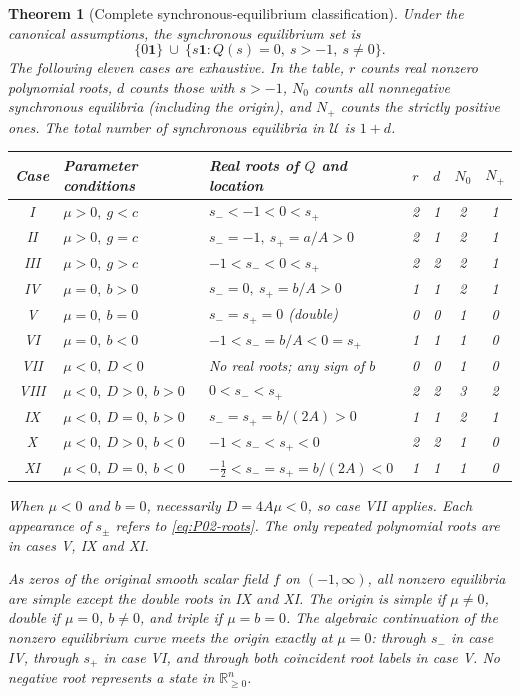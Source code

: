 \documentclass[11pt]{article}
\newcommand{\R}{\mathbb{R}}
\newcommand{\one}{\mathbf{1}}
\newcommand{\Orth}{\R_{\geq 0}^{n}}
\newcommand{\Domain}{\mathcal{U}}
\newtheorem{theorem}{Theorem}[section]
\theoremstyle{definition}
\theoremstyle{remark}
\begin{document}
\begin{theorem}[Complete synchronous-equilibrium classification]
\label{thm:P02-complete}
Under the canonical assumptions, the synchronous equilibrium set is
\begin{equation}
\label{eq:P02-equilibrium-set}
 \{0\one\}\ \cup\
 \{s\one:Q(s)=0,\ s>-1,\ s\ne0\}.
\end{equation}
The following eleven cases are exhaustive. In the table, $r$ counts
real nonzero polynomial roots, $d$ counts those with $s>-1$, $N_0$
counts all nonnegative synchronous equilibria (including the origin),
and $N_+$ counts the strictly positive ones. The total number of
synchronous equilibria in $\Domain$ is $1+d$.

\begin{center}
\small
\renewcommand{\arraystretch}{1.18}
\begin{tabular}{@{}c p{} p{} c c c c@{}}
\toprule
Case & Parameter conditions & Real roots of $Q$ and location
 & $r$ & $d$ & $N_0$ & $N_+$\\
\midrule
I & $\mu>0,\ g<c$ & $s_-<-1<0<s_+$ & 2&1&2&1\\
II & $\mu>0,\ g=c$ & $s_-=-1,\ s_+=a/A>0$ & 2&1&2&1\\
III & $\mu>0,\ g>c$ & $-1<s_-<0<s_+$ & 2&2&2&1\\
IV & $\mu=0,\ b>0$ & $s_-=0,\ s_+=b/A>0$ & 1&1&2&1\\
V & $\mu=0,\ b=0$ & $s_-=s_+=0$ (double) & 0&0&1&0\\
VI & $\mu=0,\ b<0$ & $-1<s_-=b/A<0=s_+$ & 1&1&1&0\\
VII & $\mu<0,\ D<0$ & No real roots; any sign of $b$ & 0&0&1&0\\
VIII & $\mu<0,\ D>0,\ b>0$ & $0<s_-<s_+$ & 2&2&3&2\\
IX & $\mu<0,\ D=0,\ b>0$ & $s_-=s_+=b/(2A)>0$ & 1&1&2&1\\
X & $\mu<0,\ D>0,\ b<0$ & $-1<s_-<s_+<0$ & 2&2&1&0\\
XI & $\mu<0,\ D=0,\ b<0$ & $-\tfrac12<s_-=s_+=b/(2A)<0$ & 1&1&1&0\\
\bottomrule
\end{tabular}
\end{center}
When $\mu<0$ and $b=0$, necessarily $D=4A\mu<0$, so case VII
applies. Each appearance of $s_\pm$ refers to \eqref{eq:P02-roots}.
The only repeated polynomial roots are in cases V, IX and XI.

As zeros of the original smooth scalar field $f$ on $(-1,\infty)$,
all nonzero equilibria are simple except the double roots in IX and XI.
The origin is simple if $\mu\ne0$, double if $\mu=0$, $b\ne0$,
and triple if $\mu=b=0$. The algebraic continuation of the nonzero
equilibrium curve meets the origin exactly at $\mu=0$: through $s_-$
in case IV, through $s_+$ in case VI, and through both coincident
root labels in case V. No negative root represents a state in $\Orth$.
\end{theorem}
\end{document}
